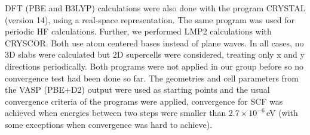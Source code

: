 \documentclass[11pt,DIV=13,BCOR=5mm,a4paper,headinclude]{scrbook}
\begin{document}
DFT (PBE and B3LYP) calculations were also done with the program CRYSTAL\cite{crystal14} (version 14), using a real-space representation.
The same program was used for periodic HF calculations.
Further, we performed LMP2 calculations with CRYSCOR\cite{cryscor}.
Both use atom centered bases instead of plane waves.
In all cases, no 3D slabs were calculated but 2D supercells were considered, treating only x and y directions periodically.
Both programs were not applied in our group before so no convergence test had been done so far.
The geometries and cell parameters from the VASP (PBE+D2) output were used as starting points and the usual convergence criteria of the programs were applied, convergence for SCF was achieved when energies between two steps were smaller than $2.7\times 10^{-6}\,$eV (with some exceptions when convergence was hard to achieve).
\\\\

\end{document}
